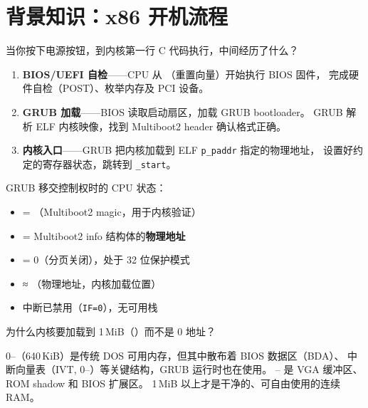 \section{背景知识：x86 开机流程}

当你按下电源按钮，到内核第一行 C 代码执行，中间经历了什么？

\begin{enumerate}
  \item \textbf{BIOS/UEFI 自检}——CPU 从 （重置向量）开始执行 BIOS 固件，
        完成硬件自检（POST）、枚举内存及 PCI 设备。
  \item \textbf{GRUB 加载}——BIOS 读取启动扇区，加载 GRUB bootloader。
        GRUB 解析 ELF 内核映像，找到 Multiboot2 header 确认格式正确。
  \item \textbf{内核入口}——GRUB 把内核加载到 ELF \texttt{p\_paddr} 指定的物理地址，
        设置好约定的寄存器状态，跳转到 \texttt{\_start}。
\end{enumerate}

\begin{cpustate}
GRUB 移交控制权时的 CPU 状态：
\begin{itemize}
  \item {} = （Multiboot2 magic，用于内核验证）
  \item {} = Multiboot2 info 结构体的\textbf{物理地址}
  \item {} = 0（分页关闭），处于 32 位保护模式
  \item {} ≈ （物理地址，内核加载位置）
  \item 中断已禁用（\texttt{IF=0}），无可用栈
\end{itemize}
\end{cpustate}

\begin{thinkbox}
为什么内核要加载到 1\,MiB（）而不是 0 地址？

0--（640\,KiB）是传统 DOS 可用内存，但其中散布着 BIOS 数据区（BDA）、
中断向量表（IVT, 0--）等关键结构，GRUB 运行时也在使用。
-- 是 VGA 缓冲区、ROM shadow 和 BIOS 扩展区。
1\,MiB 以上才是干净的、可自由使用的连续 RAM。
\end{thinkbox}


